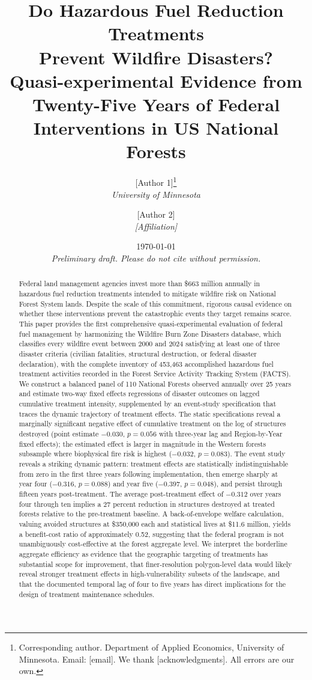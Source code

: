 \documentclass[12pt, letterpaper]{article}
\title{\textbf{Do Hazardous Fuel Reduction Treatments\\ Prevent Wildfire Disasters?}\\[0.4em]
\large Quasi-experimental Evidence from Twenty-Five Years of Federal Interventions in US National Forests}
\author{
[Author 1]\thanks{Corresponding author. Department of Applied Economics, University of Minnesota. Email: [email]. We thank [acknowledgments]. All errors are our own.} \\
\textit{University of Minnesota}
\and
[Author 2]\\
\textit{[Affiliation]}
}
\date{\today \\[1em] \textit{Preliminary draft. Please do not cite without permission.}}
\begin{document}
\maketitle
\thispagestyle{empty}

\begin{abstract}
\noindent
Federal land management agencies invest more than \$663 million annually in hazardous fuel reduction treatments intended to mitigate wildfire risk on National Forest System lands. Despite the scale of this commitment, rigorous causal evidence on whether these interventions prevent the catastrophic events they target remains scarce. This paper provides the first comprehensive quasi-experimental evaluation of federal fuel management by harmonizing the Wildfire Burn Zone Disasters database, which classifies every wildfire event between 2000 and 2024 satisfying at least one of three disaster criteria (civilian fatalities, structural destruction, or federal disaster declaration), with the complete inventory of 453{,}463 accomplished hazardous fuel treatment activities recorded in the Forest Service Activity Tracking System (FACTS). We construct a balanced panel of 110 National Forests observed annually over 25 years and estimate two-way fixed effects regressions of disaster outcomes on lagged cumulative treatment intensity, supplemented by an event-study specification that traces the dynamic trajectory of treatment effects. The static specifications reveal a marginally significant negative effect of cumulative treatment on the log of structures destroyed (point estimate $-0.030$, $p = 0.056$ with three-year lag and Region-by-Year fixed effects); the estimated effect is larger in magnitude in the Western forests subsample where biophysical fire risk is highest ($-0.032$, $p = 0.083$). The event study reveals a striking dynamic pattern: treatment effects are statistically indistinguishable from zero in the first three years following implementation, then emerge sharply at year four ($-0.316$, $p = 0.088$) and year five ($-0.397$, $p = 0.048$), and persist through fifteen years post-treatment. The average post-treatment effect of $-0.312$ over years four through ten implies a 27 percent reduction in structures destroyed at treated forests relative to the pre-treatment baseline. A back-of-envelope welfare calculation, valuing avoided structures at \$350{,}000 each and statistical lives at \$11.6 million, yields a benefit-cost ratio of approximately 0.52, suggesting that the federal program is not unambiguously cost-effective at the forest aggregate level. We interpret the borderline aggregate efficiency as evidence that the geographic targeting of treatments has substantial scope for improvement, that finer-resolution polygon-level data would likely reveal stronger treatment effects in high-vulnerability subsets of the landscape, and that the documented temporal lag of four to five years has direct implications for the design of treatment maintenance schedules.


\end{abstract}
\end{document}
